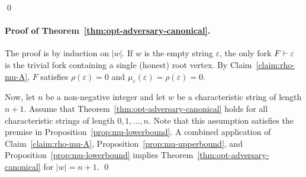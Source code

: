 \hfill\qed


\paragraph{Proof of Theorem~\ref{thm:opt-adversary-canonical}.}
The proof is by induction on $|w|$. 
If $w$ is the empty string $\varepsilon$, 
the only fork $F \vdash \varepsilon$ is the trivial fork 
containing a single (honest) root vertex. 
By Claim~\ref{claim:rho-mu-A}, 
$F$ satisfies $\rho(\varepsilon) = 0$ 
and 
$\mu_\varepsilon(\varepsilon) = \rho(\varepsilon) = 0$.

Now, let $n$ be a non-negative integer and 
let $w$ be a characteristic string of length $n+1$. 
Assume that Theorem~\ref{thm:opt-adversary-canonical} 
holds for all characteristic strings of length $0, 1, \ldots, n$. 
Note that this assumption satisfies 
the premise in Proposition~\ref{prop:mu-lowerbound}. 
A combined application of 
Claim~\ref{claim:rho-mu-A}, Proposition~\ref{prop:mu-upperbound}, 
and Proposition~\ref{prop:mu-lowerbound} 
implies 
Theorem~\ref{thm:opt-adversary-canonical} 
for $|w| = n + 1$.
\hfill\qed









